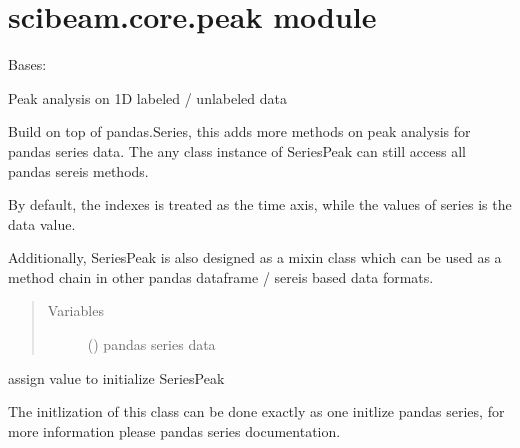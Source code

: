 \documentclass[letterpaper,10pt,english]{sphinxmanual}
\begin{document}
\section{scibeam.core.peak module}
\label{\detokenize{scibeam.core:module-scibeam.core.peak}}\label{\detokenize{scibeam.core:scibeam-core-peak-module}}

\begin{fulllineitems}
\label{\detokenize{scibeam.core:scibeam.core.peak.SeriesPeak}}
Bases: 

Peak analysis on 1D labeled / unlabeled data

Build on top of pandas.Series, this adds more methods on peak analysis for
pandas series data. The any class instance of SeriesPeak can still access
all pandas sereis methods.

By default, the indexes is treated as the time axis, while the values of
series is the data value.

Additionally, SeriesPeak is also designed as a mixin class which can be used
as a method chain in other pandas dataframe / sereis based data formats.
\begin{quote}\begin{description}
\item[{Variables}] \leavevmode
{} () \textendash{} pandas series data

\end{description}\end{quote}

\begin{fulllineitems}
\label{\detokenize{scibeam.core:scibeam.core.peak.SeriesPeak.__init__}}
assign value to initialize SeriesPeak

The initlization of this class can be done exactly as one initlize
pandas series, for more information please pandas series documentation.

\end{fulllineitems}


\end{fulllineitems}
\end{document}
